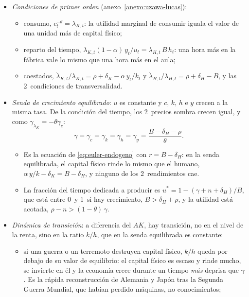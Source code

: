 \documentclass[11pt]{article}
\begin{document}
\begin{itemize}
\item \emph{Condiciones de primer orden} (anexo~\ref{anexo:uzawa-lucas}):
  \begin{itemize}
  \item consumo, $c_t^{-\theta}=\lambda_{K,t}$: la utilidad marginal de consumir iguala el valor de una unidad más de capital físico;
  \item reparto del tiempo, $\lambda_{K,t}(1-\alpha)\,y_t/u_t=\lambda_{H,t}\,B\,h_t$: una hora más en la fábrica vale lo mismo que una hora más en el aula;
  \item coestados, $\dot\lambda_{K,t}/\lambda_{K,t}=\rho+\delta_K-\alpha\,y_t/k_t$ y $\dot\lambda_{H,t}/\lambda_{H,t}=\rho+\delta_H-B$, y las 2~condiciones de transversalidad.
  \end{itemize}
\item \emph{Senda de crecimiento equilibrado}: $u$ es constante y $c$, $k$, $h$ e $y$ crecen a la misma tasa. De la condición del tiempo, los 2~precios sombra crecen igual, y como $\gamma_{\lambda_K}=-\theta\gamma_c$:
  \begin{equation}
  \gamma=\gamma_c=\gamma_k=\gamma_h=\gamma_y=\frac{B-\delta_H-\rho}{\theta}.\label{eq:ul-gamma}
  \end{equation}
  \begin{itemize}
  \item Es la ecuación de  \eqref{eq:euler-endogeno} con $r=B-\delta_H$: en la senda equilibrada, el capital físico rinde lo mismo que el humano, $\alpha\,y/k-\delta_K=B-\delta_H$, y ninguno de los 2~rendimientos cae.
  \item La fracción del tiempo dedicada a producir es $u^*=1-(\gamma+n+\delta_H)/B$, que está entre 0~y 1~si hay crecimiento, $B>\delta_H+\rho$, y la utilidad está acotada, $\rho-n>(1-\theta)\,\gamma$.
  \end{itemize}
\item \emph{Dinámica de transición}: a diferencia del $AK$, hay transición, no en el nivel de la renta, sino en la ratio $k/h$, que en la senda equilibrada es constante\nocite{BarroSalaiMartin2004}:
  \begin{itemize}
  \item si una guerra o un terremoto destruyen capital físico, $k/h$ queda por debajo de su valor de equilibrio: el capital físico es escaso y rinde mucho, se invierte en él y la economía crece durante un tiempo \emph{más} deprisa que $\gamma$. Es la rápida reconstrucción de Alemania y Japón tras la Segunda Guerra Mundial, que habían perdido máquinas, no conocimientos;

\end{itemize}
\end{itemize}
\end{document}
